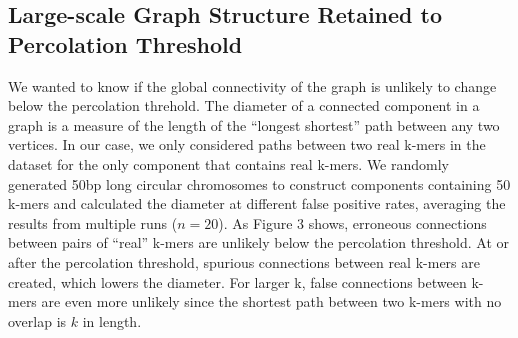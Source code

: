 \documentclass[12pt]{article} \usepackage{simplemargins}
\begin{document}
\subsection{Large-scale Graph Structure Retained to Percolation Threshold}
We wanted to know if the global connectivity of the graph is unlikely 
to change below the percolation threhold. 
The diameter of a connected component in a graph is a measure of 
the length of the ``longest shortest'' 
path between any two vertices\cite{bondy2008graph}.
In our case, we only considered paths between two real k-mers
in the dataset for the only component that contains real k-mers. 
We randomly generated 50bp long circular
chromosomes to construct components containing 50 k-mers and 
calculated the diameter at different false positive rates, averaging
the results from multiple runs ($n=20$).
As Figure 3 shows, 
erroneous connections between pairs of ``real'' k-mers are unlikely
below the 
percolation threshold. At or after the percolation threshold, spurious connections 
between real k-mers are created, which lowers the diameter. For larger k, false connections 
between k-mers are even more unlikely since the shortest path between two k-mers 
with no overlap is $k$ in length.
\end{document}
